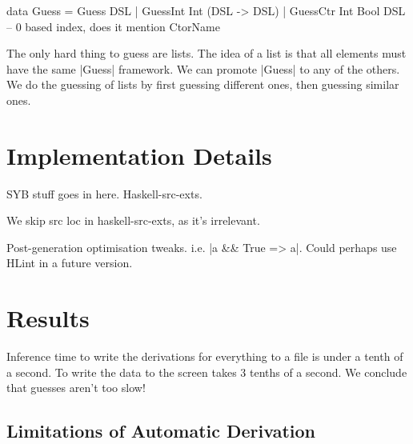 \documentclass[preprint]{sigplanconf}
\begin{document}
\begin{code}
data Guess = Guess DSL
           | GuessInt Int (DSL -> DSL)
           | GuessCtr Int Bool DSL  -- 0 based index, does it mention CtorName
\end{code}

The only hard thing to guess are lists. The idea of a list is that all elements must have the same |Guess| framework. We can promote |Guess| to any of the others. We do the guessing of lists by first guessing different ones, then guessing similar ones.

\section{Implementation Details}

SYB stuff goes in here. Haskell-src-exts.

We skip src loc in haskell-src-exts, as it's irrelevant.

Post-generation optimisation tweaks. i.e. |a && True => a|. Could perhaps use HLint in a future version.


\section{Results}

Inference time to write the derivations for everything to a file is under a tenth of a second. To write the data to the screen takes 3 tenths of a second. We conclude that guesses aren't too slow!

\subsection{Limitations of Automatic Derivation}
\label{sec:automatic_failure}
\end{document}
